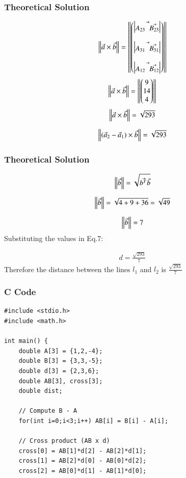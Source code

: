 \documentclass{beamer}
\begin{document}
\begin{frame}
\frametitle{Theoretical Solution}
    \begin{align}
     \left\lVert\Vec{a}\times\Vec{b}\right\rVert=\left\|\begin{pmatrix} \begin{vmatrix}\Vec{A_{23} \;\; \Vec{B_{23}}}\end{vmatrix} \\\\ \begin{vmatrix}\Vec{A_{31} \;\; \Vec{B_{31}}}\end{vmatrix} \\\\ \begin{vmatrix}\Vec{A_{12} \;\; \Vec{B_{12}}}\end{vmatrix}\end{pmatrix}  \right\|
\end{align}
\begin{align}
      \left\lVert\Vec{a}\times\Vec{b}\right\rVert=\left\|\begin{pmatrix}9\\ 14\\ 4\end{pmatrix}  \right\|
\end{align}
\begin{align}
       \left\lVert\Vec{a}\times\Vec{b}\right\rVert=\sqrt{293}
\end{align}

\begin{align}
     \left\lVert(\Vec{a}_2 - \Vec{a}_1) \times \Vec{b}\right\rVert=\sqrt{293}
\end{align}



\end{frame}
\begin{frame}
\frametitle{Theoretical Solution}
  \begin{align}
\left\lVert\Vec{b}\right\rVert=\sqrt{\Vec{b^T}\Vec{b}}
  \end{align}

\begin{align}
   \left\lVert\Vec{b}\right\rVert=\sqrt{4+9+36}=\sqrt{49}
\end{align}

\begin{align}
    \left\lVert\Vec{b}\right\rVert=7
\end{align}
Substituting the values in Eq.7:

\begin{align}
  d=\frac{\sqrt{293}}{7}
\end{align}
Therefore the distance between the lines $l_1$ and $l_2$ is $\frac{\sqrt{293}}{7}$



\end{frame}





\begin{frame}[fragile]
    \frametitle{C Code  }

    \begin{lstlisting}
#include <stdio.h>
#include <math.h>

int main() {
    double A[3] = {1,2,-4};
    double B[3] = {3,3,-5};
    double d[3] = {2,3,6};
    double AB[3], cross[3];
    double dist;

    // Compute B - A
    for(int i=0;i<3;i++) AB[i] = B[i] - A[i];

    // Cross product (AB x d)
    cross[0] = AB[1]*d[2] - AB[2]*d[1];
    cross[1] = AB[2]*d[0] - AB[0]*d[2];
    cross[2] = AB[0]*d[1] - AB[1]*d[0];

    


    \end{lstlisting}
\end{frame}
\end{document}
